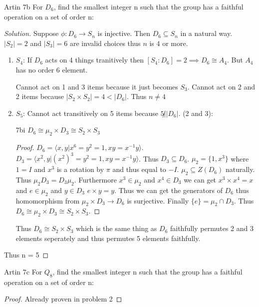 \documentclass{article}
\newenvironment{solution}
{\renewcommand\qedsymbol{$\blacksquare$}\begin{proof}[Solution]}
{\end{proof}}
\begin{document}
\begin{PROB}{Artin 7b}\label{Problem Artin 7b.}
    For $D_6$, find the smallest integer n such that the group has a faithful operation on a set of order n:
\end{PROB}
\begin{solution}
    Suppose $\phi: D_6 \to S_n$ is injective. Then $D_6 \subseteq S_n$ in a natural way. $|S_2| = 2$ and $|S_3| = 6$ are invalid choices thus $n$ is 4 or more.

    \begin{enumerate}{}
        \item $S_4$: If $D_6$ acts on 4 things tranitively then $[S_4 : D_6] = 2 \implies D_6 \cong A_4$. But $A_4$ has no order 6 element.
        
        Cannot act on 1 and 3 items because it just becomes $S_3$. Cannot act on 2 and 2 items because $|S_2 \times S_2|  = 4 < |D_6|$. Thus $n \neq 4$
        \item $S_5$: Cannot act transitively on 5 items because $5 \not | |D_6|$. (2 and 3): 
        
        \begin{claim}{7bi}
            $D_6 \cong \mu_2 \times D_3 \cong S_2 \times S_3$
        \end{claim}
        \begin{proof}
            $D_6 = \langle x ,y | x^6 = y^2 = 1, xy = x^{-1}y \rangle$. $D_3 = \langle x^2, y | (x^2)^3 = y^2 = 1, xy = x^{-1}y \rangle$. Thus $D_3 \subseteq D_6$. $\mu_2 = \{1, x^3\}$ where $1 = I$ and $x^3$ is a rotation by $\pi$ and thus equal to $-I$. $\mu_2 \subseteq Z(D_6)$ naturally. Thus $\mu_2D_3 = D_3\mu_2$. Furthermore $x^3 \in \mu_2$ and $x^4 \in D_3$ we can get $x^3 \times x^4 = x$ and $e \in \mu_2$ and $y \in D_3$ $e \times y = y$. Thus we can get the generators of $D_6$ thus homomorphism from $\mu_2 \times D_3 \to D_6$ is surjective. Finally $\{e\} = \mu_2 \cap D_3$. Thus $D_6 \cong \mu_2 \times D_3 \cong S_2 \times S_3$.
        \end{proof}

        Thus $D_6 \cong S_2 \times S_3$ which is the same thing as $D_6$ faithfully permutes 2 and 3 elements seperately and thus permutes 5 elements faithfully.
    \end{enumerate}

    Thus n = 5
\end{solution}

\begin{PROB}{Artin 7c}\label{Problem 7c.}
    For $Q_8$, find the smallest integer n such that the group has a faithful operation on a set of order n:
\end{PROB}
\begin{proof}
    Already proven in problem 2
\end{proof}
\end{document}
